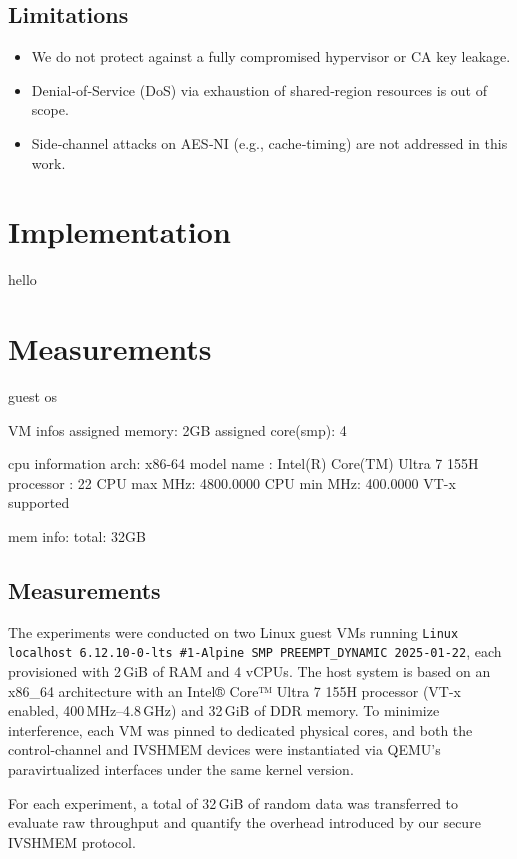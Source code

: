 \documentclass[conference]{IEEEtran}
\begin{document}
\subsection{Limitations}
\begin{itemize}
  \item We do not protect against a fully compromised hypervisor or CA key leakage.
  \item Denial‐of‐Service (DoS) via exhaustion of shared‐region resources is out of scope.
  \item Side‐channel attacks on AES‐NI (e.g., cache‐timing) are not addressed in this work.
\end{itemize}



\section{Implementation}

hello


\section{Measurements}


guest os 

VM infos
assigned memory: 2GB
assigned core(smp): 4

cpu information
arch: x86-64
model name	: Intel(R) Core(TM) Ultra 7 155H
processor	: 22 
CPU max MHz:          4800.0000
CPU min MHz:          400.0000
VT-x supported


mem info:
total: 32GB

\subsection{Measurements}

The experiments were conducted on two Linux guest VMs running
\texttt{Linux localhost 6.12.10-0-lts \#1-Alpine SMP PREEMPT\_DYNAMIC 2025-01-22},
each provisioned with 2\,GiB of RAM and 4 vCPUs. The host system is based on an
x86\_64 architecture with an Intel® Core™ Ultra 7 155H processor (VT-x enabled,
400\,MHz–4.8\,GHz) and 32\,GiB of DDR memory. To minimize interference, each VM
was pinned to dedicated physical cores, and both the control-channel and IVSHMEM
devices were instantiated via QEMU’s paravirtualized interfaces under the same
kernel version.  

For each experiment, a total of 32\,GiB of random data was transferred to evaluate raw throughput and quantify the overhead introduced by our secure IVSHMEM protocol.
\end{document}
